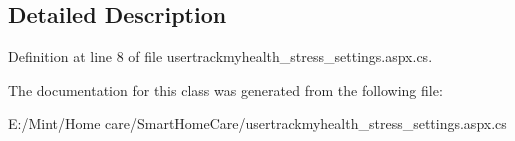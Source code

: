 \subsection{Detailed Description}


Definition at line 8 of file usertrackmyhealth\-\_\-stress\-\_\-settings.\-aspx.\-cs.



The documentation for this class was generated from the following file\-:\begin{DoxyCompactItemize}
\item 
E\-:/\-Mint/\-Home care/\-Smart\-Home\-Care/usertrackmyhealth\-\_\-stress\-\_\-settings.\-aspx.\-cs\end{DoxyCompactItemize}
